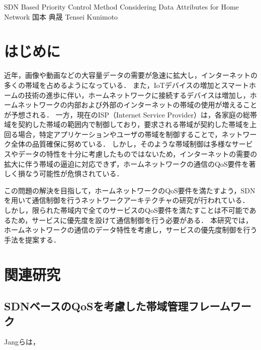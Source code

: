 \documentclass[a4paper,10pt,twocolumn,uplatex]{jsarticle}
\date{11}
\begin{document}
{SDN Based Priority Control Method Considering Data Attributes for Home Network}
{国本 典晟}
{Tensei Kunimoto}

\section{はじめに}
近年，画像や動画などの大容量データの需要が急速に拡大し，インターネットの多くの帯域を占めるようになっている．
また，IoTデバイスの増加とスマートホームの技術の進歩に伴い，ホームネットワークに接続するデバイスは増加し，ホームネットワークの内部および外部のインターネットの帯域の使用が増えることが予想される．
一方，現在のISP（Internet Service Provider）は，各家庭の総帯域を契約した帯域の範囲内で制御しており，要求される帯域が契約した帯域を上回る場合，特定アプリケーションやユーザの帯域を制御することで，ネットワーク全体の品質確保に努めている．
しかし，そのような帯域制御は多様なサービスやデータの特性を十分に考慮したものではないため，インターネットの需要の拡大に伴う帯域の逼迫に対応できず，ホームネットワークの通信のQoS要件を著しく損なう可能性が危惧されている．\par
この問題の解決を目指して，ホームネットワークのQoS要件を満たすよう，SDNを用いて通信制御を行うネットワークアーキテクチャの研究が行われている．
しかし，限られた帯域内で全てのサービスのQoS要件を満たすことは不可能であるため，サービスに優先度を設けて通信制御を行う必要がある．
本研究では，ホームネットワークの通信のデータ特性を考慮し，サービスの優先度制御を行う手法を提案する．\par

\section{関連研究}

\subsection{SDNベースのQoSを考慮した帯域管理フレームワーク}
Jangらは，
\end{document}
